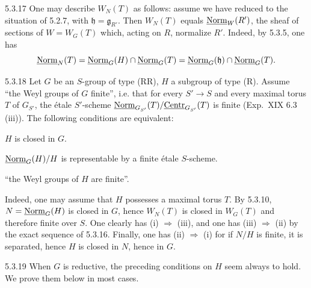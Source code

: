 \begin{remark}{5.3.17}\label{XXII.5.3.17}
One may describe $W_N(T)$ as follows: assume we have reduced to the situation of 5.2.7, with $\mathfrak h=\mathfrak g_{R'}$. Then $W_N(T)$ equals $\underline{\mathrm{Norm}}_W(R')$, the sheaf of sections of $W=W_G(T)$ which, acting on $R$, normalize $R'$. Indeed, by 5.3.5, one has
\[
\underline{\mathrm{Norm}}_N(T)=\underline{\mathrm{Norm}}_G(H)\cap\underline{\mathrm{Norm}}_G(T)=\underline{\mathrm{Norm}}_G(\mathfrak h)\cap\underline{\mathrm{Norm}}_G(T).
\]
\end{remark}
\begin{corollary}{5.3.18}\label{XXII.5.3.18}
Let $G$ be an $S$-group of type (RR), $H$ a subgroup of type (R). Assume ``the Weyl groups of $G$ finite'', i.e. that for every $S'\to S$ and every maximal torus $T$ of $G_{S'}$, the \'etale $S'$-scheme $\underline{\mathrm{Norm}}_{G_{S'}}(T)/\underline{\mathrm{Centr}}_{G_{S'}}(T)$ is finite (\cf Exp.~XIX 6.3 (iii)). The following conditions are equivalent:
\begin{enumeratei}
\item $H$ is closed in $G$.
\item $\underline{\mathrm{Norm}}_G(H)/H$ is representable by a finite \'etale $S$-scheme.
\item ``the Weyl groups of $H$ are finite''.
\end{enumeratei}
\end{corollary}
Indeed, one may assume that $H$ possesses a maximal torus $T$. By 5.3.10, $N=\underline{\mathrm{Norm}}_G(H)$ is closed in $G$, hence $W_N(T)$ is closed in $W_G(T)$ and therefore finite over $S$. One clearly has (i) $\Rightarrow$ (iii), and one has (iii) $\Rightarrow$ (ii) by the exact sequence of 5.3.16. Finally, one has (ii) $\Rightarrow$ (i) for if $N/H$ is finite, it is separated, hence $H$ is closed in $N$, hence in $G$.
\begin{remark}{5.3.19}\label{XXII.5.3.19}
When $G$ is reductive, the preceding conditions on $H$ seem always to hold. We prove them below in most cases.
\end{remark}

